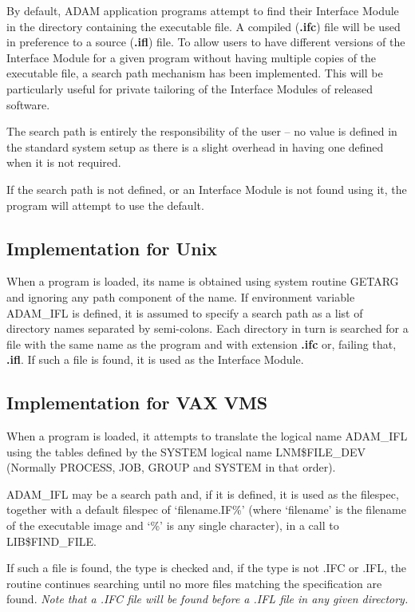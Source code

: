 \documentclass[twoside,11pt,nolof]{starlink}
\begin{document}
By default, ADAM application programs  attempt to find their Interface Module
in the directory containing the executable file. A compiled (\textbf{.ifc}) file
will be used in preference to a source (\textbf{.ifl}) file.
To allow users to have different versions of the Interface Module for a given
program without having multiple copies of the executable file, a search path
mechanism has been implemented.
This will be particularly useful for private tailoring of the Interface
Modules of released software.

The search path is entirely the responsibility of the user --
no value is defined in the standard system setup as there is a slight overhead
in having one defined when it is not required.

If the search path is not defined, or an Interface Module is not found using
it, the program will attempt to use the default.

\subsection{Implementation for Unix}

When a program is loaded, its name is obtained using system routine GETARG and
ignoring any path component of the name.
If environment variable ADAM\_IFL is defined, it is
assumed to specify a search path as a list of directory names separated by
semi-colons.
Each directory in turn is searched for a file with the same name
as the program and with extension \textbf{.ifc} or, failing that, \textbf{.ifl}.
If such a file is found, it is used as the Interface Module.

\subsection{Implementation for VAX VMS}

When a program is loaded, it attempts to translate the logical name ADAM\_IFL
using the tables defined by the SYSTEM logical name LNM\$FILE\_DEV (Normally
PROCESS, JOB, GROUP and SYSTEM in that order).

ADAM\_IFL may be a search path and, if it is defined, it is used as the
filespec, together with a default filespec of `filename.IF\%' (where
`filename' is the filename of the executable image and `\%' is any single
character), in a call to LIB\$FIND\_FILE.

If such a file is found, the type is checked and, if the type is not .IFC
or .IFL, the routine continues searching until no more files matching
the specification are found.
\emph{Note that a .IFC file will be found before a .IFL file in any given
directory.}
\end{document}
